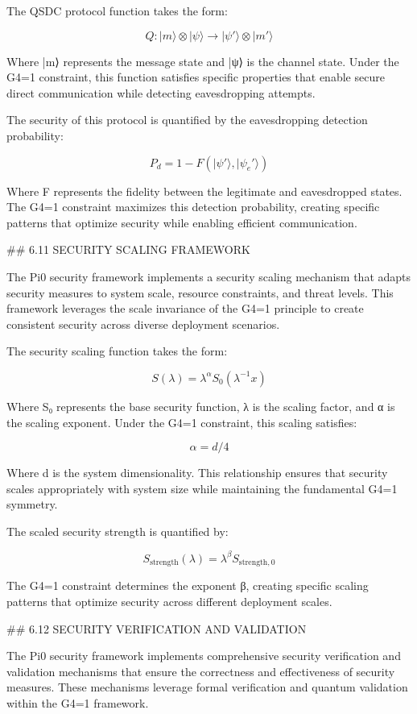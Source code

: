 The QSDC protocol function takes the form:

$$Q: |m\rangle \otimes |\psi\rangle \rightarrow |\psi'\rangle \otimes |m'\rangle$$

Where |m⟩ represents the message state and |ψ⟩ is the channel state. Under the G4=1 constraint, this function satisfies specific properties that enable secure direct communication while detecting eavesdropping attempts.

The security of this protocol is quantified by the eavesdropping detection probability:

$$P_d = 1 - F(|\psi'\rangle, |\psi_e'\rangle)$$

Where F represents the fidelity between the legitimate and eavesdropped states. The G4=1 constraint maximizes this detection probability, creating specific patterns that optimize security while enabling efficient communication.

## 6.11 SECURITY SCALING FRAMEWORK

The Pi0 security framework implements a security scaling mechanism that adapts security measures to system scale, resource constraints, and threat levels. This framework leverages the scale invariance of the G4=1 principle to create consistent security across diverse deployment scenarios.

The security scaling function takes the form:

$$S(\lambda) = \lambda^{\alpha} S_0(\lambda^{-1} x)$$

Where S₀ represents the base security function, λ is the scaling factor, and α is the scaling exponent. Under the G4=1 constraint, this scaling satisfies:

$$\alpha = d/4$$

Where d is the system dimensionality. This relationship ensures that security scales appropriately with system size while maintaining the fundamental G4=1 symmetry.

The scaled security strength is quantified by:

$$S_{\text{strength}}(\lambda) = \lambda^{\beta} S_{\text{strength},0}$$

The G4=1 constraint determines the exponent β, creating specific scaling patterns that optimize security across different deployment scales.

## 6.12 SECURITY VERIFICATION AND VALIDATION

The Pi0 security framework implements comprehensive security verification and validation mechanisms that ensure the correctness and effectiveness of security measures. These mechanisms leverage formal verification and quantum validation within the G4=1 framework.

